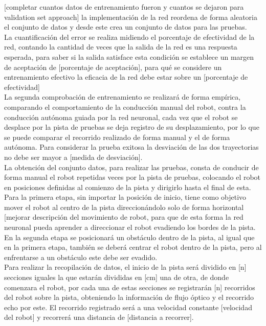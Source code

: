 \documentclass{iccmemoria}
\begin{document}
[completar cuantos datos de entrenamiento fueron y cuantos se dejaron para validation set approach]
la implementación de la red reordena de forma aleatoria el conjunto de datos y desde este crea un conjunto de datos para las pruebas.\\

La cuantificación del error se realiza midiendo el porcentaje de efectividad de la red, contando la cantidad de veces que la salida de la red es una respuesta esperada, para saber si la salida satisface esta condición se establece un margen de aceptación de [porcentaje de aceptación], para qué se considere un entrenamiento efectivo la eficacia de la red debe estar sobre un [porcentaje de efectividad]\\ 

La segunda comprobación de entrenamiento se realizará de forma empírica, comparando el comportamiento de la conducción manual del robot, contra la conducción autónoma guiada por la red neuronal, cada vez que el robot se desplace por la pista de pruebas se deja registro de su desplazamiento, por lo que se puede comparar el recorrido realizado de forma manual y el de forma autónoma. Para considerar la prueba exitosa la desviación de las dos trayectorias no debe ser mayor a [medida de desviación].\\

La obtención del conjunto datos, para realizar las pruebas, consta de conducir de forma manual el robot repetidas veces por la pista de pruebas, colocando el robot en posiciones definidas al comienzo de la pista y dirigirlo hasta el final de esta.\\

Para la primera etapa, sin importar la posición de inicio, tiene como objetivo mover el robot al centro de la pista direccionándolo solo de forma horizontal [mejorar descripción del movimiento de robot, para que de esta forma la red neuronal pueda aprender a direccionar el robot evadiendo los bordes de la pista.\\

En la segunda etapa se posicionará un obstáculo dentro de la pista, al igual que en la primera etapa, también se deberá centrar el robot dentro de la pista, pero al enfrentarse a un obstáculo este debe ser evadido.\\

Para realizar la recopilación de datos, el inicio de la pista será dividido en [n] secciones iguales la que estarán divididas en [cm] una de otra, de donde comenzara el robot, por cada una de estas secciones se registrarán [n] recorridos del robot sobre la pista, obteniendo la información de flujo óptico y el recorrido echo por este. El recorrido registrado será a una velocidad constante [velocidad del robot] y recorrerá una distancia de [distancia a recorrer].\\
\end{document}
